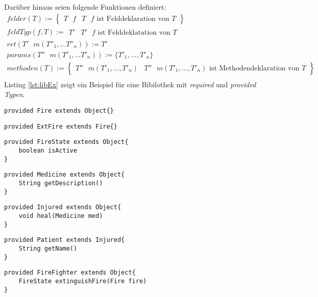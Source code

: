 Darüber hinaus seien folgende Funktionen definiert:
\begin{gather*}
\mathit{felder(T)} :=  \left\{ 
				\begin{array}{l|l}
					T \texttt{ }\mathit{f} & T \texttt{ }\mathit{f}\text{ ist Felddeklaration von }T
				\end{array}
              \right\}
\\
\mathit{feldTyp(f,T)} := 
				\begin{array}{l|l}
					T' & T' \texttt{ }\mathit{f}\text{ ist Felddeklatation von }T
				\end{array}   
\\
\mathit{ret(T'\text{ }m(T''_1,...T''_n))} := T'
\\
\mathit{params(T''\text{ }m(T'_1,...T'_n))} := \{ T'_1,...,T'_n \}
\\   
\mathit{methoden(T)} := \left\{ 
				\begin{array}{l|l}
					T'' \text{ }m(T'_1,...,T'_n) & T'' \text{ }m(T'_1,...,T'_n) \text{ ist Methodendeklaration von }T
				\end{array}
              \right\}
\\        
\end{gather*}
\noindent
Listing \ref{lst:libEx} zeigt ein Beispiel für eine Bibilothek mit \emph{required} und \emph{provided Typen}.
\begin{lstlisting}[style = dsl]
provided Fire extends Object{}
\end{lstlisting}

\begin{lstlisting}[style = dsl]
provided ExtFire extends Fire{}
\end{lstlisting}


\begin{lstlisting}[style = dsl]
provided FireState extends Object{
	boolean isActive
}
\end{lstlisting}

\begin{lstlisting}[style = dsl]
provided Medicine extends Object{
	String getDescription()
}
\end{lstlisting}

\begin{lstlisting}[style = dsl]
provided Injured extends Object{
	void heal(Medicine med)	
}
\end{lstlisting}


\begin{lstlisting}[style = dsl]
provided Patient extends Injured{
	String getName()
}
\end{lstlisting}
\begin{lstlisting}[style = dsl]
provided FireFighter extends Object{
	FireState extinguishFire(Fire fire)
}
\end{lstlisting}

